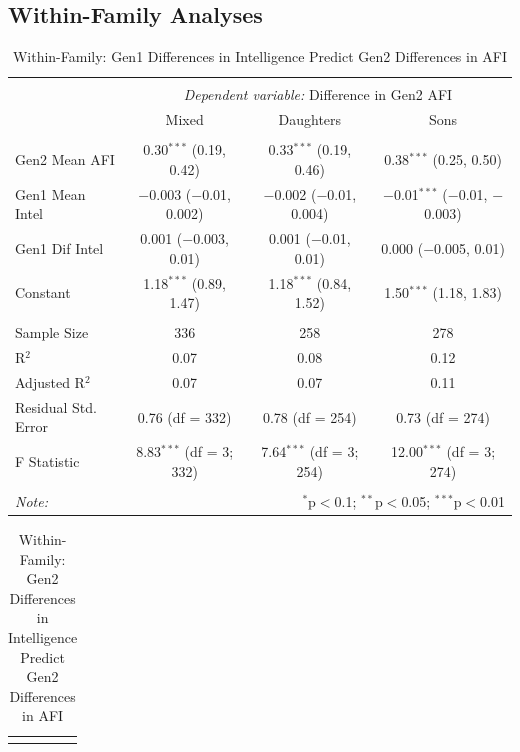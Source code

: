 \documentclass[a4paper,man,apacite,natbib,12pt,longtable]{apa6}\usepackage[]{graphicx}\usepackage[]{color}
\begin{document}
\begin{landscape}
  \subsection{Within-Family Analyses}
\begin{longtable}{@{\extracolsep{5pt}}lccc} 
  \caption{Within-Family: Gen1 Differences in Intelligence Predict Gen2 Differences in AFI} \label{table_Dif_Mom_Intelligence_Dif_Child_AFI_10}
  \\[-1.8ex]\hline 
  \hline \\[-3.8ex] 
  & \multicolumn{3}{c}{\textit{Dependent variable:} Difference in Gen2 AFI} \\ 
  \cline{2-4}
 & Mixed & Daughters & Sons \\ 
\hline \\[-1.8ex] 
 Gen2 Mean AFI & 0.30$^{***}$ (0.19, 0.42) & 0.33$^{***}$ (0.19, 0.46) & 0.38$^{***}$ (0.25, 0.50) \\ 
  Gen1 Mean Intel & $-$0.003 ($-$0.01, 0.002) & $-$0.002 ($-$0.01, 0.004) & $-$0.01$^{***}$ ($-$0.01, $-$0.003) \\ 
  Gen1 Dif Intel & 0.001 ($-$0.003, 0.01) & 0.001 ($-$0.01, 0.01) & 0.000 ($-$0.005, 0.01) \\ 
  Constant & 1.18$^{***}$ (0.89, 1.47) & 1.18$^{***}$ (0.84, 1.52) & 1.50$^{***}$ (1.18, 1.83) \\ 
 \hline \\[-1.8ex] 
Sample Size & 336 & 258 & 278 \\ 
R$^{2}$ & 0.07 & 0.08 & 0.12 \\ 
Adjusted R$^{2}$ & 0.07 & 0.07 & 0.11 \\ 
Residual Std. Error & 0.76 (df = 332) & 0.78 (df = 254) & 0.73 (df = 274) \\ 
F Statistic & 8.83$^{***}$ (df = 3; 332) & 7.64$^{***}$ (df = 3; 254) & 12.00$^{***}$ (df = 3; 274) \\ 
\hline 
\hline \\[-1.8ex] 
\textit{Note:}  & \multicolumn{3}{r}{$^{*}$p$<$0.1; $^{**}$p$<$0.05; $^{***}$p$<$0.01} \\ 
  \end{longtable}\pagebreak
  \begin{longtable}{@{\extracolsep{5pt}}lccc} 
  \caption{Within-Family: Gen2 Differences in Intelligence Predict Gen2 Differences in AFI} \label{table_Dif_Child_Intelligence_Dif_Child_AFI_10}
  \\[-1.8ex]\hline 
  \hline \\[-3.8ex] 

\end{longtable}
\end{landscape}
\end{document}
